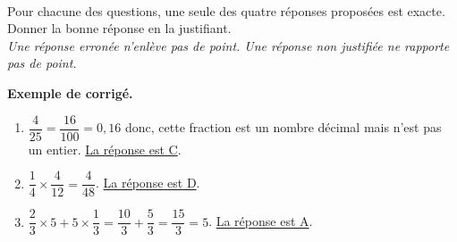 \begin{activite}
   \ \\ [-16mm]
   \begin{QCM}
      Pour chacune des questions, une seule des quatre réponses proposées est exacte. Donner la bonne réponse en la justifiant. \\
      {\it Une réponse erronée n’enlève pas de point. Une réponse non justifiée ne rapporte pas de point.}
      \begin{center}
      \end{center} \bigskip
   \end{QCM}

   \bigskip
   
   \textcolor{G1}{
   {\bf Exemple de corrigé.} \smallskip
      \begin{enumerate}      
         \item $\dfrac4{25} =\dfrac{16}{100} =0,16$ donc, cette fraction est un nombre décimal mais n'est pas un entier. \hfill \uline{La réponse est C}. \medskip 
         \item $\dfrac14\times\dfrac4{12} =\dfrac4{48}$. \hfill \uline{La réponse est D}. \medskip 
         \item $\dfrac23\times5+5\times\dfrac13 =\dfrac{10}{3}+\dfrac53 =\dfrac{15}{3} =5$. \hfill \uline{La réponse est A}.
     \end{enumerate}} 
\end{activite}


